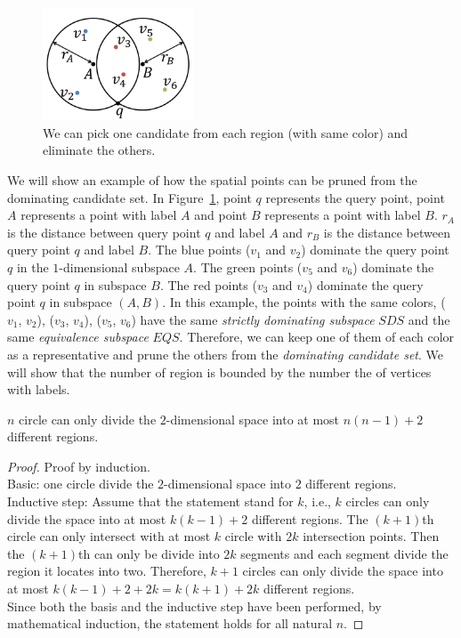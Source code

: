 \begin{figure}[h]
    \centering
      \includegraphics[width=0.4\textwidth]{figs/Circle_Spatial_Example}
    \caption{We can pick one candidate from each region (with same color) and eliminate the others.}
    \label{fig:circle_example}
\end{figure}

We will show an example of how the spatial points can be pruned from the dominating candidate set. In Figure~\ref{fig:circle_example}, point $q$ represents the query point, point $A$ represents a point with label $A$ and point $B$ represents a point with label $B$. $r_{A}$ is the distance between query point $q$ and label $A$ and $r_{B}$ is the distance between query point $q$ and label $B$. The blue points ($v_1$ and $v_2$) dominate the query point $q$ in the $1$-dimensional subspace $A$. The green points ($v_5$ and $v_6$) dominate the query point $q$ in subspace $B$. The red points ($v_3$ and $v_4$) dominate the query point $q$ in subspace $(A, B)$. In this example, the points with the same colors, ($v_1$, $v_2$), ($v_3$, $v_4$), ($v_5$, $v_6$) have the same \emph{strictly dominating subspace} $\mathit{SDS}$ and the same \emph{equivalence subspace} $\mathit{EQS}$. Therefore, we can keep one of them of each color as a representative and prune the others from the \emph{dominating candidate set}. We will show that the number of region is bounded by the number the of vertices with labels.

\begin{property}
\label{ppt:circle_space}
$n$ circle can only divide the $2$-dimensional space into at most $n(n-1)+2$ different regions.
\end{property}

\begin{proof}
Proof by induction.\\
Basic: one circle divide the $2$-dimensional space into $2$ different regions.\\
Inductive step: Assume that the statement stand for $k$, i.e., $k$ circles can only divide the space into at most $k(k-1)+2$ different regions. The $(k+1)$th circle can only intersect with at most $k$ circle with $2k$ intersection points. Then the $(k+1)$th can only be divide into $2k$ segments and each segment divide the region it locates into two. Therefore, $k+1$ circles can only divide the space into at most $k(k-1)+2+2k = k(k+1)+2k$ different regions.\\
Since both the basis and the inductive step have been performed, by mathematical induction, the statement holds for all natural $n$.
\end{proof}

